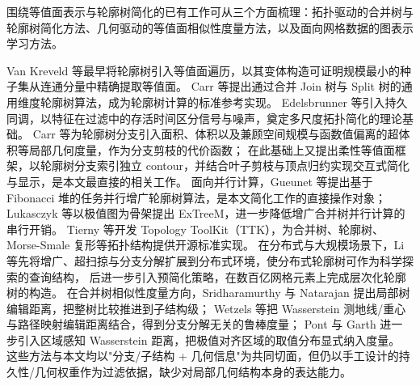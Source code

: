 \documentclass[twocolumn, a4paper, 10pt]{article}
\begin{document}
围绕等值面表示与轮廓树简化的已有工作可从三个方面梳理：拓扑驱动的合并树与轮廓树简化方法、几何驱动的等值面相似性度量方法，以及面向网格数据的图表示学习方法。

Van Kreveld 等最早将轮廓树引入等值面遍历，以其变体构造可证明规模最小的种子集从连通分量中精确提取等值面。\cite{van_kreveld_1997} Carr 等提出通过合并 Join 树与 Split 树的通用维度轮廓树算法，成为轮廓树计算的标准参考实现。\cite{carr_contour_2003} Edelsbrunner 等引入持久同调，以特征在过滤中的存活时间区分信号与噪声，奠定多尺度拓扑简化的理论基础。\cite{edelsbrunner_persistence_2002} Carr 等为轮廓树分支引入面积、体积以及兼顾空间规模与函数值偏离的超体积等局部几何度量，作为分支剪枝的代价函数；\cite{carr_geometric_2004} 在此基础上又提出柔性等值面框架，以轮廓树分支索引独立 contour，并结合叶子剪枝与顶点归约实现交互式简化与显示，是本文最直接的相关工作。\cite{carr_flexible_2010} 面向并行计算，Gueunet 等提出基于 Fibonacci 堆的任务并行增广轮廓树算法，是本文简化工作的直接操作对象；\cite{gueunet_act_2019} Lukasczyk 等以极值图为骨架提出 ExTreeM，进一步降低增广合并树并行计算的串行开销。\cite{lukasczyk_extreem_2023} Tierny 等开发 Topology ToolKit（TTK），为合并树、轮廓树、Morse-Smale 复形等拓扑结构提供开源标准实现。\cite{tierny_ttk_2018} 在分布式与大规模场景下，Li 等先将增广、超扫掠与分支分解扩展到分布式环境，使分布式轮廓树可作为科学探索的查询结构，\cite{li_distributed_2024} 后进一步引入预简化策略，在数百亿网格元素上完成层次化轮廓树的构造。\cite{li_presimplification_2025} 在合并树相似性度量方向，Sridharamurthy 与 Natarajan 提出局部树编辑距离，把整树比较推进到子结构级；\cite{sridharamurthy_local_2021} Wetzels 等把 Wasserstein 测地线/重心与路径映射编辑距离结合，得到分支分解无关的鲁棒度量；\cite{wetzels_path_2023} Pont 与 Garth 进一步引入区域感知 Wasserstein 距离，把极值对齐区域的取值分布显式纳入度量。\cite{pont_region_2025} 这些方法与本文均以"分支/子结构 + 几何信息"为共同切面，但仍以手工设计的持久性/几何权重作为过滤依据，缺少对局部几何结构本身的表达能力。
\end{document}

